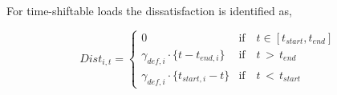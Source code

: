 \documentclass[12pt,a4paper]{article}
\begin{document}
For time-shiftable loads the dissatisfaction is identified as,

\begin{equation}
        Dist_{i,t}=
        \left\{ \begin{array}{ll}
            0 & \text{if}\quad t \in [t_{start}, t_{end}]\\
           \gamma_{def,i}\cdot \{t - t_{end,i}\} &\text{if}\quad t\,>\,t_{end}\\
           \gamma_{def,i}\cdot \{t_{start,i}-t\} &\text{if}\quad t\,<\,t_{start}
        \end{array} \right.
    \end{equation}




\end{document}
